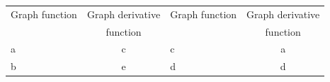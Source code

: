 \begin{Exercise}
\begin{figure}[H]
\centering
\centerline{
}
\centerline{
}
\caption{\label{fig_test2_2}}
\end{figure}
\end{Exercise}

\begin{Answer}
\renewcommand{\arraystretch}{1.25}
\begin{tabular}{l|c|l|c}
Graph function&Graph derivative &Graph function&Graph derivative\\
&function&& function\\\hline
a&c&c&a\\[0.2cm]\hline
b&e&d&d\\
\end{tabular}
\renewcommand{\arraystretch}{1.25}    
\end{Answer}


